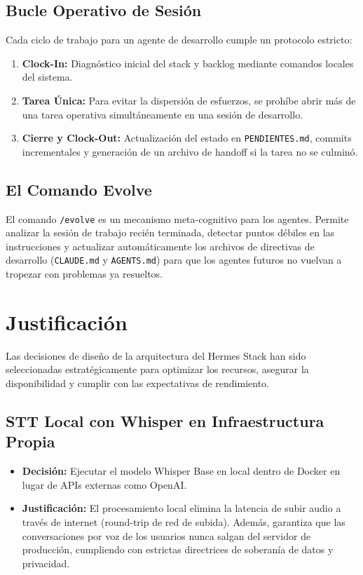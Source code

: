 \documentclass[12pt,a4paper,openany]{book}
\newcommand{\code}[1]{\texttt{\small#1}}
\begin{document}
\section{Bucle Operativo de Sesión}
Cada ciclo de trabajo para un agente de desarrollo cumple un protocolo estricto:
\begin{enumerate}
    \item \textbf{Clock-In:} Diagnóstico inicial del stack y backlog mediante comandos locales del sistema.
    \item \textbf{Tarea Única:} Para evitar la dispersión de esfuerzos, se prohíbe abrir más de una tarea operativa simultáneamente en una sesión de desarrollo.
    \item \textbf{Cierre y Clock-Out:} Actualización del estado en \code{PENDIENTES.md}, commits incrementales y generación de un archivo de handoff si la tarea no se culminó.
\end{enumerate}

\section{El Comando Evolve}
El comando \code{/evolve} es un mecanismo meta-cognitivo para los agentes. Permite analizar la sesión de trabajo recién terminada, detectar puntos débiles en las instrucciones y actualizar automáticamente los archivos de directivas de desarrollo (\code{CLAUDE.md} y \code{AGENTS.md}) para que los agentes futuros no vuelvan a tropezar con problemas ya resueltos.

\chapter{Justificación}
Las decisiones de diseño de la arquitectura del Hermes Stack han sido seleccionadas estratégicamente para optimizar los recursos, asegurar la disponibilidad y cumplir con las expectativas de rendimiento.

\section{STT Local con Whisper en Infraestructura Propia}
\begin{itemize}
    \item \textbf{Decisión:} Ejecutar el modelo Whisper Base en local dentro de Docker en lugar de APIs externas como OpenAI.
    \item \textbf{Justificación:} El procesamiento local elimina la latencia de subir audio a través de internet (round-trip de red de subida). Además, garantiza que las conversaciones por voz de los usuarios nunca salgan del servidor de producción, cumpliendo con estrictas directrices de soberanía de datos y privacidad.
\end{itemize}
\end{document}

